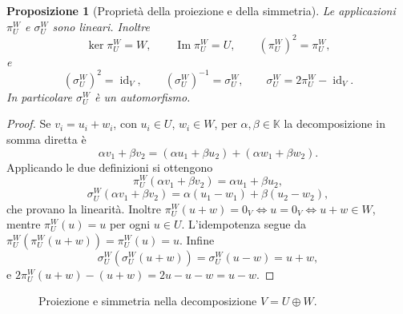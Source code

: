 \documentclass[11pt,a4paper]{article}
\newcommand{\KK}{\mathbb{K}}
\theoremstyle{plain}
\newtheorem{prop}{Proposizione}[section]
\theoremstyle{definition}
\theoremstyle{remark}
\begin{document}
\begin{prop}[Proprietà della proiezione e della simmetria]
Le applicazioni $\pi_U^W$ e $\sigma_U^W$ sono lineari. Inoltre
\[
 \ker\pi_U^W=W,\qquad \operatorname{Im}\pi_U^W=U,
 \qquad (\pi_U^W)^2=\pi_U^W,
\]
e
\[
 (\sigma_U^W)^2=\operatorname{id}_V,\qquad
 (\sigma_U^W)^{-1}=\sigma_U^W,\qquad
 \sigma_U^W=2\pi_U^W-\operatorname{id}_V.
\]
In particolare $\sigma_U^W$ è un automorfismo.
\end{prop}
\begin{proof}
Se $v_i=u_i+w_i$, con $u_i\in U$, $w_i\in W$,
per $\alpha,\beta\in\KK$ la decomposizione in somma diretta è
\[
 \alpha v_1+\beta v_2
 =(\alpha u_1+\beta u_2)+(\alpha w_1+\beta w_2).
\]
Applicando le due definizioni si ottengono
\[
 \pi_U^W(\alpha v_1+\beta v_2)
 =\alpha u_1+\beta u_2,
\]
\[
 \sigma_U^W(\alpha v_1+\beta v_2)
 =\alpha(u_1-w_1)+\beta(u_2-w_2),
\]
che provano la linearità. Inoltre
$\pi_U^W(u+w)=0_V\iff u=0_V\iff u+w\in W$,
mentre $\pi_U^W(u)=u$ per ogni $u\in U$.
L'idempotenza segue da $\pi_U^W(\pi_U^W(u+w))=\pi_U^W(u)=u$.
Infine
\[
 \sigma_U^W(\sigma_U^W(u+w))
 =\sigma_U^W(u-w)=u+w,
\]
e $2\pi_U^W(u+w)-(u+w)=2u-u-w=u-w$.
\end{proof}

\begin{figure}[ht]
\centering
{}
\caption{Proiezione e simmetria nella decomposizione $V=U\oplus W$.}
\end{figure}
\end{document}
